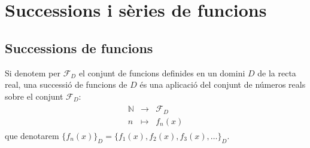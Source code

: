 \section{Successions i sèries de funcions}
\subsection{Successions de funcions}
Si denotem per $\mathcal{F}_{D}$ el conjunt de funcions definides en un domini $D$ de la recta real, una successió de funcions de $D$ és una aplicació del conjunt de números reals sobre el conjunt $\mathcal{F}_{D}$:
\begin{align}
    \begin{matrix}
        \mathbb{N} & \to & \mathcal{F}_{D} \\
        n & \mapsto & f_{n} (x)
    \end{matrix}
\end{align}
que denotarem $\{ f_{n} (x) \}_{D} = \{ f_{1}(x), f_{2}(x), f_{3}(x), \dots \}_{D}$.

